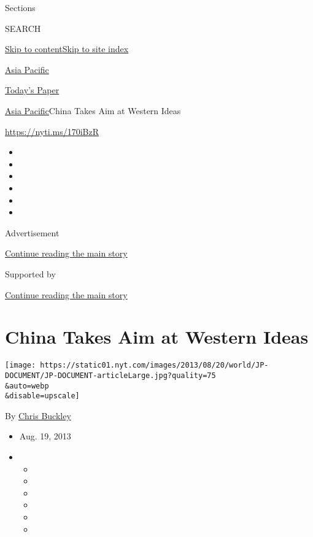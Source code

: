 Sections

SEARCH

\protect\hyperlink{site-content}{Skip to
content}\protect\hyperlink{site-index}{Skip to site index}

\href{https://www.nytimes.com/section/world/asia}{Asia Pacific}

\href{https://myaccount.nytimes.com/auth/login?response_type=cookie\&client_id=vi}{}

\href{https://www.nytimes.com/section/todayspaper}{Today's Paper}

\href{/section/world/asia}{Asia Pacific}\textbar{}China Takes Aim at
Western Ideas

\url{https://nyti.ms/170iBzR}

\begin{itemize}
\item
\item
\item
\item
\item
\item
\end{itemize}

Advertisement

\protect\hyperlink{after-top}{Continue reading the main story}

Supported by

\protect\hyperlink{after-sponsor}{Continue reading the main story}

\hypertarget{china-takes-aim-at-western-ideas}{%
\section{China Takes Aim at Western
Ideas}\label{china-takes-aim-at-western-ideas}}

\texttt{[image: https://static01.nyt.com/images/2013/08/20/world/JP-DOCUMENT/JP-DOCUMENT-articleLarge.jpg?quality=75\\\&auto=webp\\\&disable=upscale]}

By \href{https://www.nytimes.com/by/chris-buckley}{Chris Buckley}

\begin{itemize}
\item
  Aug. 19, 2013
\item
  \begin{itemize}
  \item
  \item
  \item
  \item
  \item
  \item
  \end{itemize}
\end{itemize}

